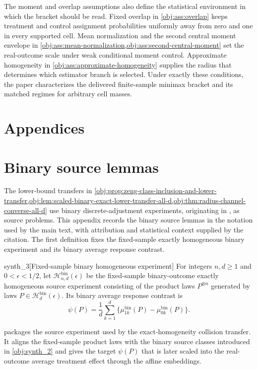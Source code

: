 \documentclass[11pt]{article}
\begin{document}
The moment and overlap assumptions also define the statistical environment in which the bracket should be read. Fixed overlap in \cref{obj:ass:overlap} keeps treatment and control assignment probabilities uniformly away from zero and one in every supported cell. Mean normalization and the second central moment envelope in \cref{obj:ass:mean-normalization,obj:ass:second-central-moment} set the real-outcome scale under weak conditional moment control. Approximate homogeneity in \cref{obj:ass:approximate-homogeneity} supplies the radius that determines which estimator branch is selected. Under exactly these conditions, the paper characterizes the delivered finite-sample minimax bracket and its matched regimes for arbitrary cell masses.


\appendix

\section*{Appendices}

\section{Binary source lemmas}

The lower-bound transfers in \cref{obj:prop:zeng-class-inclusion-and-lower-transfer,obj:lem:scaled-binary-exact-lower-transfer-all-d,obj:thm:radius-channel-converse-all-d} use binary discrete-adjustment experiments, originating in \citet{ZengBalakrishnanHanKennedy2024}, as source problems. This appendix records the binary source lemmas in the notation used by the main text, with attribution and statistical context supplied by the citation. The first definition fixes the fixed-sample exactly homogeneous binary experiment and its binary average response contrast.

\begin{definitionv}{synth_3}[Fixed-sample binary homogeneous experiment]
For integers \(n,d\ge1\) and \(0<\epsilon<1/2\), let \(\mathcal H_{n,d}^{\mathrm{bin}}(\epsilon)\) be the fixed-sample binary-outcome exactly homogeneous source experiment consisting of the product laws \(P^{\otimes n}\) generated by laws \(P\in\mathcal H_d^{\mathrm{bin}}(\epsilon)\). Its binary average response contrast is
\[
\psi(P)=\frac1d\sum_{k=1}^d\{\mu_{1k}^{\mathrm{bin}}(P)-\mu_{0k}^{\mathrm{bin}}(P)\}.
\]
\end{definitionv}

 packages the source experiment used by the exact-homogeneity collision transfer. It aligns the fixed-sample product laws with the binary source classes introduced in \cref{obj:synth_2} and gives the target \(\psi(P)\) that is later scaled into the real-outcome average treatment effect through the affine embeddings.
\end{document}

